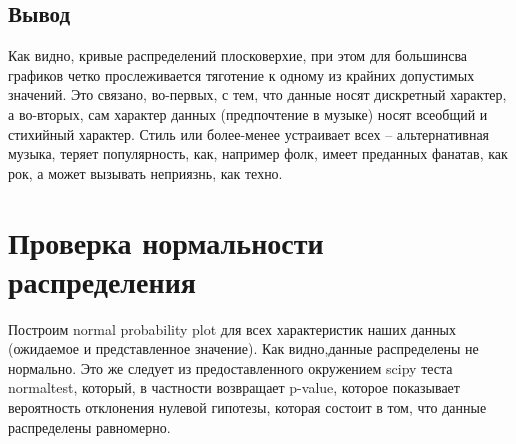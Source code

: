 \documentclass[11pt]{article}
\begin{document}
\subsection{Вывод}
Как видно, кривые распределений плосковерхие, при этом для большинсва графиков четко прослеживается 
тяготение к одному из крайних допустимых значений. Это связано, во-первых, с тем, что данные носят дискретный
характер, а во-вторых, сам характер данных (предпочтение в музыке) носят всеобщий и стихийный характер. Стиль или более-менее устраивает всех -- альтернативная музыка, теряет популярность, как, например фолк, имеет преданных фанатав, как рок,
а может вызывать неприязнь, как техно. 

\section{Проверка нормальности распределения}
Построим normal probability plot для всех характеристик наших данных (ожидаемое и представленное 
значение). Как видно,данные распределены не нормально. Это же следует из предоставленного окружением 
scipy теста normaltest, который, в частности возвращает p-value, которое показывает вероятность 
отклонения нулевой гипотезы, которая состоит в том, что данные распределены равномерно. 
\end{document}
